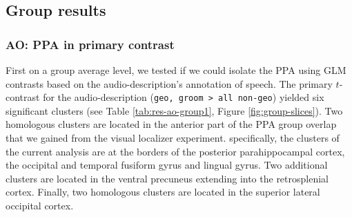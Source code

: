 \documentclass[english]{article}
\begin{document}

\subsection{Group results}





\subsubsection{AO: PPA in primary contrast}

First on a group average level, we tested if we could isolate the PPA using GLM
contrasts based on the audio-description's annotation of speech.
The primary $t$-contrast for the audio-description (\texttt{geo, groom > all
non-geo}) yielded six significant clusters (see Table \ref{tab:res-ao-group1},
Figure \ref{fig:group-slices}).
Two homologous clusters are located in the anterior part of the PPA group
overlap that we gained from the visual localizer experiment.
specifically, the clusters of the current analysis are at the borders of the
posterior parahippocampal cortex, the occipital and temporal fusiform gyrus and
lingual gyrus.
Two additional clusters are located in the ventral precuneus extending into the
retrosplenial cortex.
Finally, two homologous clusters are located in the superior lateral occipital
cortex.
\end{document}
